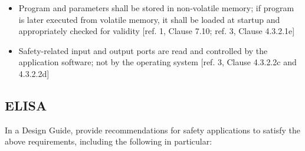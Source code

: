 \documentclass[12pt]{../Common_files/ElisaPaper}
\begin{document}
\begin{itemize}
\item Program and parameters shall be stored in non-volatile memory; if program is later executed from volatile memory, it shall be loaded at startup and appropriately  checked for validity [ref. 1, Clause 7.10; ref. 3, Clause 4.3.2.1e]

\item Safety-related input and output ports are read and controlled by the application software; not by the operating system  [ref. 3, Clause 4.3.2.2c and 4.3.2.2d]

\end{itemize}

\subsection{ELISA}
In a Design Guide, provide recommendations for safety applications to satisfy the above requirements, including the following in particular:
\end{document}
